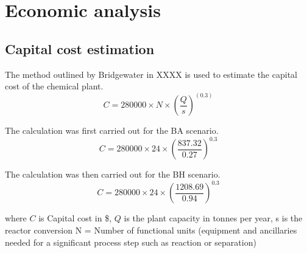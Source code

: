 
\section{Economic analysis}
\label{app:economics}
\subsection{Capital cost estimation}

The method outlined by Bridgewater in XXXX is used to estimate the capital cost of the chemical plant.
\begin{equation}
    C=280000 \times N \times (\frac{Q}{s})^(0.3)
\end{equation}

The calculation was first carried out for the BA scenario.
\begin{equation}
    C=280000 \times 24 \times (\frac{837.32}{0.27})^0.3
\end{equation}
    
The calculation was then carried out for the BH scenario.
\begin{equation}
    C=280000 \times 24 \times (\frac{1208.69}{0.94} )^0.3
\end{equation}

where $C$ is Capital cost in \$, $Q$ is the plant capacity in tonnes per year, s is the reactor conversion
N = Number of functional units (equipment and ancillaries needed for a significant process step such as reaction or separation)